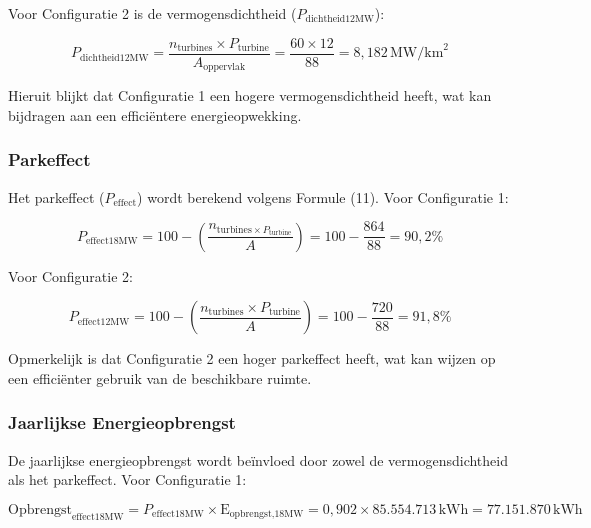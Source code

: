 Voor Configuratie 2 is de vermogensdichtheid (\(P_{\text{dichtheid12MW}}\)):

\begin{equation} \label{eq:19}
P_{\text{dichtheid12MW}} = \frac{{n_{\text{turbines}} \times P_{\text{turbine}}}}{{A_{\text{oppervlak}}}} = \frac{{60 \times 12}}{{88}} = 8,182 \, \text{MW/km}^2
\end{equation}

Hieruit blijkt dat Configuratie 1 een hogere vermogensdichtheid heeft, wat kan bijdragen aan een efficiëntere energieopwekking.

\subsubsection{Parkeffect}

Het parkeffect (\(P_{\text{effect}}\)) wordt berekend volgens Formule (11). Voor Configuratie 1:

\begin{equation} \label{eq:20}
P_{\text{effect18MW}} = 100 - \left(\frac{{n_{\text{turbines} \times P_{\text{turbine}}}}}{{A}} \right) = 100 - \frac{{864}}{{88}} = 90,2\%
\end{equation}

Voor Configuratie 2:

\begin{equation} \label{eq:21}
P_{\text{effect12MW}} = 100 - \left(\frac{{n_{\text{turbines}} \times P_{\text{turbine}}}}{{A}} \right) = 100 - \frac{{720}}{{88}} = 91,8\%
\end{equation}

Opmerkelijk is dat Configuratie 2 een hoger parkeffect heeft, wat kan wijzen op een efficiënter gebruik van de beschikbare ruimte.

\subsubsection{Jaarlijkse Energieopbrengst}

De jaarlijkse energieopbrengst wordt beïnvloed door zowel de vermogensdichtheid als het parkeffect. Voor Configuratie 1:

\begin{equation} \label{eq:22}
\text{Opbrengst}_{\text{effect18MW}} = P_{\text{effect18MW}} \times \text{E}_{\text{opbrengst,18MW}} = 0,902 \times 85.554.713 \, \text{kWh} = 77.151.870 \, \text{kWh}
\end{equation}

